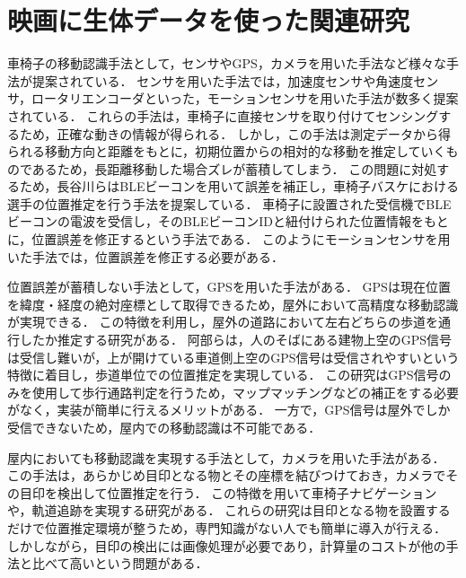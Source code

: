 \section{映画に生体データを使った関連研究}
車椅子の移動認識手法として，センサやGPS，カメラを用いた手法など様々な手法が提案されている．
センサを用いた手法では，加速度センサや角速度センサ，ロータリエンコーダといった，モーションセンサを用いた手法が数多く提案されている\cite{en-Accelerometer, en-kalman}．
これらの手法は，車椅子に直接センサを取り付けてセンシングするため，正確な動きの情報が得られる．
しかし，この手法は測定データから得られる移動方向と距離をもとに，初期位置からの相対的な移動を推定していくものであるため，長距離移動した場合ズレが蓄積してしまう．
この問題に対処するため，長谷川らはBLEビーコンを用いて誤差を補正し，車椅子バスケにおける選手の位置推定を行う手法を提案している\cite{baske}．
車椅子に設置された受信機でBLEビーコンの電波を受信し，そのBLEビーコンIDと紐付けられた位置情報をもとに，位置誤差を修正するという手法である．
このようにモーションセンサを用いた手法では，位置誤差を修正する必要がある．

位置誤差が蓄積しない手法として，GPSを用いた手法がある．
GPSは現在位置を緯度・経度の絶対座標として取得できるため，屋外において高精度な移動認識が実現できる．
この特徴を利用し，屋外の道路において左右どちらの歩道を通行したか推定する研究がある．
阿部らは，人のそばにある建物上空のGPS信号は受信し難いが，上が開けている車道側上空のGPS信号は受信されやすいという特徴に着目し，歩道単位での位置推定を実現している\cite{gps}．
この研究はGPS信号のみを使用して歩行通路判定を行うため，マップマッチングなどの補正をする必要がなく，実装が簡単に行えるメリットがある．
一方で，GPS信号は屋外でしか受信できないため，屋内での移動認識は不可能である．

屋内においても移動認識を実現する手法として，カメラを用いた手法がある．
この手法は，あらかじめ目印となる物とその座標を結びつけておき，カメラでその目印を検出して位置推定を行う．
この特徴を用いて車椅子ナビゲーション\cite{marker}や，軌道追跡\cite{en-baske}を実現する研究がある．
これらの研究は目印となる物を設置するだけで位置推定環境が整うため，専門知識がない人でも簡単に導入が行える．
しかしながら，目印の検出には画像処理が必要であり，計算量のコストが他の手法と比べて高いという問題がある．

